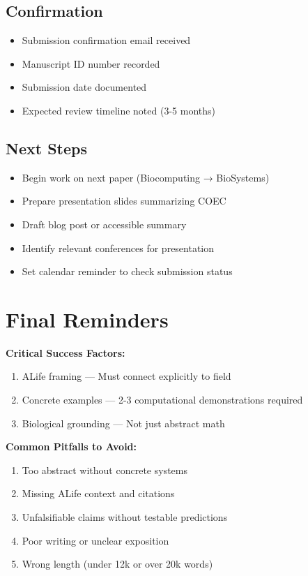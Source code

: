 \documentclass[11pt]{article}
\begin{document}
\subsection{Confirmation}

\begin{itemize}[label=$\square$]
    \item Submission confirmation email received
    \item Manuscript ID number recorded
    \item Submission date documented
    \item Expected review timeline noted (3-5 months)
\end{itemize}

\subsection{Next Steps}

\begin{itemize}[label=$\square$]
    \item Begin work on next paper (Biocomputing → BioSystems)
    \item Prepare presentation slides summarizing COEC
    \item Draft blog post or accessible summary
    \item Identify relevant conferences for presentation
    \item Set calendar reminder to check submission status
\end{itemize}

\section*{Final Reminders}

\textbf{Critical Success Factors:}
\begin{enumerate}
    \item \textcolor{urgent}{ALife framing} — Must connect explicitly to field
    \item \textcolor{urgent}{Concrete examples} — 2-3 computational demonstrations required
    \item \textcolor{urgent}{Biological grounding} — Not just abstract math
\end{enumerate}

\textbf{Common Pitfalls to Avoid:}
\begin{enumerate}
    \item Too abstract without concrete systems
    \item Missing ALife context and citations
    \item Unfalsifiable claims without testable predictions
    \item Poor writing or unclear exposition
    \item Wrong length (under 12k or over 20k words)
\end{enumerate}
\end{document}
